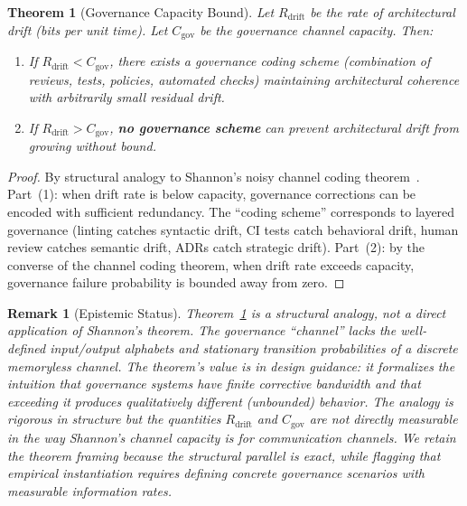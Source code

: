 \documentclass[11pt, a4paper, copyright]{googledeepmind}
\newtheorem{theorem}{Theorem}[section]
\newtheorem*{remark}{Remark}
\begin{document}
\begin{theorem}[Governance Capacity Bound]
\label{thm:capacity}
Let $R_{\mathrm{drift}}$ be the rate of architectural drift (bits per unit time). Let $C_{\mathrm{gov}}$ be the governance channel capacity. Then:
\begin{enumerate}
    \item If $R_{\mathrm{drift}} < C_{\mathrm{gov}}$, there exists a governance coding scheme (combination of reviews, tests, policies, automated checks) maintaining architectural coherence with arbitrarily small residual drift.
    \item If $R_{\mathrm{drift}} > C_{\mathrm{gov}}$, \textbf{no governance scheme} can prevent architectural drift from growing without bound.
\end{enumerate}
\end{theorem}

\begin{proof}
By structural analogy to Shannon's noisy channel coding theorem~\citep{shannon1948}. Part~(1): when drift rate is below capacity, governance corrections can be encoded with sufficient redundancy. The ``coding scheme'' corresponds to layered governance (linting catches syntactic drift, CI tests catch behavioral drift, human review catches semantic drift, ADRs catch strategic drift). Part~(2): by the converse of the channel coding theorem, when drift rate exceeds capacity, governance failure probability is bounded away from zero.
\end{proof}

\begin{remark}[Epistemic Status]
\label{rem:channel-epistemic}
Theorem~\ref{thm:capacity} is a \emph{structural analogy}, not a direct application of Shannon's theorem. The governance ``channel'' lacks the well-defined input/output alphabets and stationary transition probabilities of a discrete memoryless channel. The theorem's value is in design guidance: it formalizes the intuition that governance systems have finite corrective bandwidth and that exceeding it produces qualitatively different (unbounded) behavior. The analogy is rigorous in structure but the quantities $R_{\mathrm{drift}}$ and $C_{\mathrm{gov}}$ are not directly measurable in the way Shannon's channel capacity is for communication channels. We retain the theorem framing because the structural parallel is exact, while flagging that empirical instantiation requires defining concrete governance scenarios with measurable information rates.
\end{remark}
\end{document}
